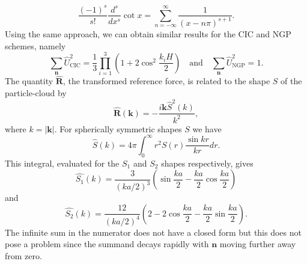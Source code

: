 \begin{equation*}
    \frac{(-1)^s}{s!}\frac{d^s}{dx^s}\cot x = \sum_{n=-\infty}^{\infty} \frac{1}{(x-n\pi)^{s+1}}.
\end{equation*}
Using the same approach, we can obtain similar results for the CIC and NGP schemes, namely
\begin{equation*}
    \sum_{\mathbf{n}}\hat{U}_\text{CIC}^2 = \frac{1}{3} \prod_{i=1}^{3}  \left(1 + 2\cos^2\frac{k_i H}{2}\right)
    \quad \text{and} \quad
    \sum_{\mathbf{n}}\hat{U}_\text{NGP}^2 = 1.
\end{equation*}
The quantity $\hat{\mathbf{R}}$, the transformed reference force, is related to the shape $S$ of the particle-cloud by
\begin{equation*}
    \hat{\mathbf{R}}(\mathbf{k}) = -\frac{i\mathbf{k}\hat{S}^2(k)}{k^2},
\end{equation*}
where $k = |\mathbf{k}|$.
For spherically symmetric shapes $S$ we have
\begin{equation*}
    \hat{S}(k) = 4\pi \int_{0}^{\infty} r^2 S(r)\frac{\sin kr}{kr}dr.
\end{equation*}
This integral, evaluated for the $S_1$ and $S_2$ shapes respectively, gives
\begin{equation*}
    \hat{S_1}(k) = \frac{3}{(ka/2)^3}  \left(\sin\frac{ka}{2} - \frac{ka}{2} \cos\frac{ka}{2}\right)
\end{equation*}
and
\begin{equation*}
    \hat{S_2}(k) = \frac{12}{(ka/2)^4}\left(2 - 2\cos\frac{ka}{2}-\frac{ka}{2}\sin\frac{ka}{2}\right).
\end{equation*}
The infinite sum in the numerator does not have a closed form but this does not pose a problem since the summand decays rapidly with $\mathbf{n}$ moving further away from zero.

